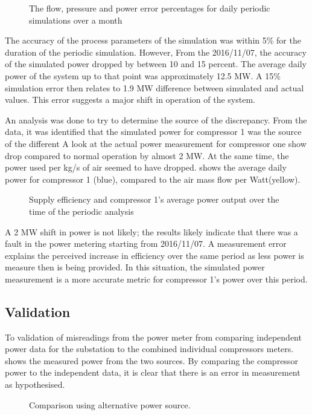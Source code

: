 	\begin{figure}[h!]
		\centering
		
		\caption{The flow, pressure and power error percentages for daily periodic simulations over a month}
		\label{fig: Periodic simulation}
	\end{figure} 
The accuracy of the process parameters of the simulation was within 5\% for the duration of the periodic simulation. However, From the 2016/11/07, the accuracy of the simulated power dropped by between 10 and 15 percent. The average daily power of the system up to that point was approximately 12.5 MW. A 15\% simulation error then relates to 1.9 MW difference between simulated and actual values. This error suggests a major shift in operation of the system.
\par 
An analysis was done to try to determine the source of the discrepancy. From the data, it was identified that the simulated power for compressor 1 was the source of the different A look at the actual power measurement for compressor one show drop compared to normal operation by almost 2 MW. At the same time, the power used per kg/s of air seemed to have dropped.  shows the average daily power for compressor 1 (blue), compared to the air mass flow per Watt(yellow). 
\par
	\begin{figure}[h!]
		\centering
		
		\caption{Supply efficiency and compressor 1's average power output over the time of the periodic analysis}
		\label{fig: MeasurementAccuracy.}
	\end{figure} 

A 2 MW shift in power is not likely; the results likely indicate that there was a fault in the power metering starting from 2016/11/07. A measurement error explains the perceived increase in efficiency over the same period as less power is measure then is being provided.  In this situation, the simulated power measurement is a more accurate metric for compressor 1’s power over this period.
 \subsection{Validation}
To validation of misreadings from the power meter from comparing independent power data for the substation to the combined individual compressors meters. shows the measured power from the two sources. By comparing the compressor power to the independent data, it is clear that there is an error in measurement as hypothesised.
	\begin{figure}[h!]
		\centering
		
		\caption{Comparison using alternative power source.}
		\label{fig: Corrected Periodic simulation}
	\end{figure} 
	
